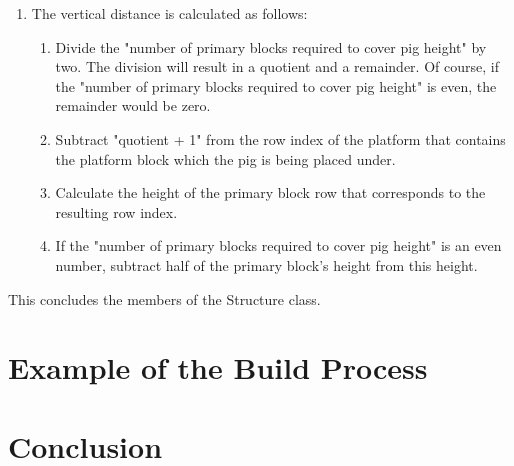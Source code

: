 \documentclass{dalthesis}
\begin{document}
\begin{enumerate}
\begin{enumerate}
\begin{enumerate}
      \item The vertical distance is calculated as follows:

      \begin{enumerate}
        \item Divide the "number of primary blocks required to cover pig height" by two. The division will result in a quotient and a remainder. Of course, if the "number of primary blocks required to cover pig height" is even, the remainder would be zero.

        \item Subtract "quotient + 1" from the row index of the platform that contains the platform block which the pig is being placed under.

        \item Calculate the height of the primary block row that corresponds to the resulting row index.

        \item If the "number of primary blocks required to cover pig height" is an even number, subtract half of the primary block's height from this height.
      \end{enumerate}
    \end{enumerate}
  \end{enumerate}
\end{enumerate}

This concludes the members of the Structure class.

\chapter{Example of the Build Process}\label{sec:tutorial}

\chapter{Conclusion}\label{sec:conclusion}
\end{document}
